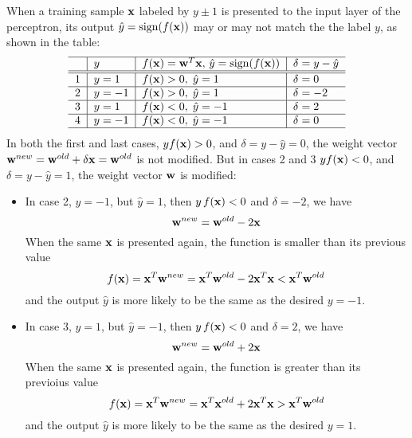 \documentclass{article}
\DeclareMathOperator{\sign}{sign}
\begin{document}
When a training sample ${\bf x}$ labeled by $y\pm 1$ is presented to the
input layer of the perceptron, its output $\hat{y}=\sign(f({\bf x}))$ may
or may not match the the label $y$, as shown in the table:
\begin{equation}
  \begin{tabular}{c|l|l|l} \hline
    & $y$ & $f({\bf x})={\bf w}^T{\bf x},\,\hat{y}
    =\sign(f({\bf x}))$ & $\delta=y-\hat{y}$\\ \hline \hline
    1 & $y= 1$ & $f({\bf x})>0,\;\hat{y}= 1$ & $\delta=0$  \\ \hline
    2 & $y=-1$ & $f({\bf x})>0,\;\hat{y}= 1$ & $\delta=-2$ \\ \hline
    3 & $y= 1$ & $f({\bf x})<0,\;\hat{y}=-1$ & $\delta=2$  \\ \hline
    4 & $y=-1$ & $f({\bf x})<0,\;\hat{y}=-1$ & $\delta=0$  \\ \hline
  \end{tabular} 
\end{equation}
In both the first and last cases, $y f({\bf x})>0$, and $\delta=y-\hat{y}=0$, 
the weight vector ${\bf w}^{new}={\bf w}^{old}+\delta{\bf x}={\bf w}^{old}$ is 
not modified. But in cases 2 and 3 $y f({\bf x})<0$, and $\delta=y-\hat{y}=1$, 
the weight vector ${\bf w}$ is modified: 
\begin{itemize}
\item In case 2, $y=-1$, but $\hat{y}=1$, then $y\,f({\bf x})<0$ and
  $\delta=-2$, we have
  \begin{equation} 
    {\bf w}^{new}={\bf w}^{old}-2{\bf x}	
    \label{learningLaw0}
  \end{equation}
  When the same ${\bf x}$ is presented again, the function is smaller
  than its previous value
  \begin{equation}	
    f({\bf x})={\bf x}^T{\bf w}^{new}={\bf x}^T{\bf w}^{old}-2{\bf x}^T{\bf x} 
    < {\bf x}^T{\bf w}^{old}	
  \end{equation}
  and the output $\hat{y}$ is more likely to be the same as the desired 
  $y=-1$.

\item In case 3, $y=1$, but $\hat{y}=-1$, then $y\,f({\bf x})<0$ and
  $\delta=2$, we have
  \begin{equation} 
    {\bf w}^{new}={\bf w}^{old}+2{\bf x}	
    \label{learningLaw1}
  \end{equation}
  When the same ${\bf x}$ is presented again, the function is greater
  than its previoius value
  \begin{equation}	
    f({\bf x})={\bf x}^T{\bf w}^{new}={\bf x}^T{\bf x}^{old}+2{\bf x}^T{\bf x}
    > {\bf x}^T{\bf w}^{old}	
  \end{equation}
  and the output $\hat{y}$ is more likely to be the same as the desired
  $y=1$.
\end{itemize}
\end{document}
